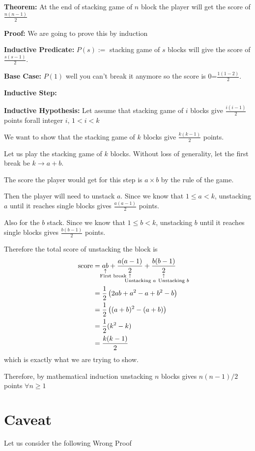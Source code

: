 \documentclass[a4paper, 12pt]{article}
\newcommand{\half}{\frac{1}{2}}
\newcommand{\theorem}{\noindent\textbf{Theorem:} }
\newcommand{\predicate}{\noindent\textbf{Inductive Predicate:} }
\newcommand{\inductivestep}{\noindent\textbf{Inductive Step:} }
\renewcommand{\proof}{\noindent\textbf{Proof:} }
\newcommand{\basecase}{\noindent\textbf{Base Case:} }
\newcommand{\inductivehypothesis}{\noindent\textbf{Inductive Hypothesis:} }
\newcommand{\expl}[2]{%
	\underset{\substack{\uparrow\\\mathrlap{\text{\hspace{-1em}#2}}}}{#1}}
\theoremstyle{examplestyle}
\begin{document}
\begin{multicols}{2}
\theorem At the end of stacking game of $n$ block the player will get the score of $\frac{n(n-1)}{2}$

\proof We are going to prove this by induction

\predicate $P(s):=$ stacking game of $s$ blocks will give the score of $\frac{s(s-1)}{2}$.

\basecase $P(1)$ well you can't break it anymore so the score is 0=$\frac{1(1-2)}{2}$\checkmark.

\inductivestep

\inductivehypothesis Let assume that stacking game of $i$ blocks give $\frac{i(i-1)}{2}$ points forall integer $i$, $1< i < k$

We want to show that the stacking game of $k$ blocks give $\frac{k(k-1)}{2}$ points.

Let us play the stacking game of $k$ blocks. Without loss of generality, let the first break be $k \to a + b$.

The score the player would get for this step is $a \times b$ by the rule of the game.

Then the player will need to unstack $a$. Since we know that $1\le a < k$, unstacking $a$ until it reaches single blocks gives $\frac{a(a-1)}{2}$ points.

Also for the $b$ stack. Since we know that $1 \le b < k$, unstacking $b$ until it reaches single blocks gives $\frac{b(b-1)}{2}$ points.

Therefore the total score of unstacking the block is
\begin{align*}
	\text{score} &= \expl{ab}{First break} + \expl{\frac{a(a-1)}{2}}{Unstacking $a$} + \expl{\frac{b(b-1)}{2}}{Unstacking $b$}\\
	&= \half \left( 2ab + a^2 -a + b^2 - b\right)\\
	&= \half \left((a+b)^2 - (a+b)\right)\\
	&= \half (k^2 - k)\\
	&= \frac{k(k-1)}{2}
\end{align*}
which is exactly what we are trying to show.

Therefore, by mathematical induction unstacking $n$ blocks gives $n(n-1)/2$ points $\forall n \ge 1$

\section*{Caveat}

Let us consider the following Wrong Proof


\end{multicols}
\end{document}
